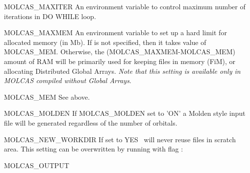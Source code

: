 \begin{variablelist}
\item[MOLCAS\_MAXITER]
An environment variable to control maximum number of iterations in DO WHILE loop.

\item[MOLCAS\_MAXMEM]
An environment variable to set up a hard limit for allocated memory (in Mb).
If is not specified, then it takes value of MOLCAS\_MEM. Otherwise, the (MOLCAS\_MAXMEM-MOLCAS\_MEM)
amount of RAM will be primarily used for keeping files in memory (FiM), or allocating Distributed Global Arrays.
{\it Note that this setting is available only in MOLCAS compiled without Global Arrays}.
\item[MOLCAS\_MEM]
See above.
\item[MOLCAS\_MOLDEN]
If MOLCAS\_MOLDEN set to 'ON' a Molden style input file will be generated regardless of the number of orbitals.
\item[MOLCAS\_NEW\_WORKDIR]
If set to YES \molcas\ will never reuse files in scratch area.
This setting can be overwritten by running  with flag :
\item[MOLCAS\_OUTPUT]

\end{variablelist}
